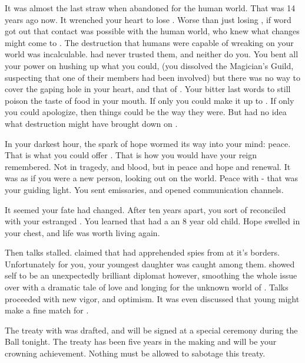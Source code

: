 \documentclass[char]{NeptuneBall}
\begin{document}
It was almost the last straw when \cAriel{\Prince} \cAriel{} abandoned \pAtlantis{} for the human world. That was 14 years ago now.  It wrenched your heart to lose \cAriel{\them{}}. Worse than just losing \cAriel{\them}, if word got out that contact was possible with the human world, who knew what changes might come to \pAtlantis{}. The destruction that humans were capable of wreaking on your world was incalculable. \cExKing{\King} \cExKing{} had never trusted them, and neither do you. You bent all your power on hushing up what you could, (you dissolved the Magician's Guild, suspecting that one of their members had been involved) but there was no way to cover the gaping hole in your heart, and that of \pAtlantis{}. Your bitter last words to \cAriel{\Prince{}} \cAriel{\MYname{}} still poison the taste of food in your mouth. If only you could make it up to \cAriel{\them}. If only you could apologize, then things could be the way they were. But \cAriel{\they{}} had no idea what destruction \cAriel{\they{}} might have brought down on \pAtlantis{}.

In your darkest hour, the spark of hope wormed its way into your mind: peace. That is what you could offer \pAtlantis{}. That is how you would have your reign remembered. Not in tragedy, and blood, but in peace and hope and renewal. It was as if you were a new person, looking out on the world. Peace with \pPacifica{} - that was your guiding light. You sent emissaries, and opened communication channels. 

It seemed your fate had changed. After ten years apart, you sort of reconciled with your estranged \cAriel{\offspring} \cAriel{}.  You learned that \cAriel{} had a an 8 year old child. Hope swelled in your chest, and life was worth living again.  

Then talks stalled. \pPacifica{} claimed that had apprehended spies from \pAtlantis{} at it's borders. Unfortunately for you, your youngest daughter \cPrincess{} was caught among them. \cPrincess{\They} showed \cPrincess{\them}self to be an unexpectedly brilliant diplomat however, smoothing the whole issue over with a dramatic tale of love and longing for the unknown world of \pPacifica{}. Talks proceeded with new vigor, and optimism. It was even discussed that young \cPrince{\prince} \cPrince{} might make a fine match for \cPrincess{}.

The treaty with \pPacifica{} was drafted, and will be signed at a special ceremony during the Ball tonight. The treaty has been five years in the making and will be your crowning achievement. Nothing must be allowed to sabotage this treaty.
\end{document}
